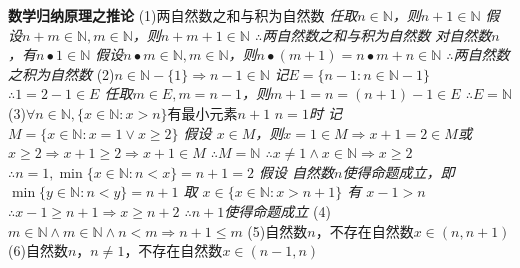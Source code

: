 \documentclass[11pt]{article}
\begin{document}
\textbf{数学归纳原理之推论} \newline
(1)两自然数之和与积为自然数 \newline
\textit{任取$n \in \mathbb{N}$，则$n+1 \in \mathbb{N}$ \newline
假设$n+m \in \mathbb{N}, m \in \mathbb{N}$，则$n+m+1 \in \mathbb{N}$ \newline
$\therefore$两自然数之和与积为自然数 \newline
对自然数$n$，有$n \bullet 1 \in \mathbb{N}$ \newline
假设$n \bullet m \in \mathbb{N}, m \in \mathbb{N}$，则$n\bullet(m+1)=n\bullet m+n \in \mathbb{N}$ \newline
$\therefore$两自然数之积为自然数} \newline
(2)$n \in \mathbb{N}-\{1\} \Rightarrow n-1 \in \mathbb{N}$ \newline
\textit{记$E=\{n-1:n\in \mathbb{N}-{1}\}$ \newline
$\therefore 1=2-1 \in E$ \newline
任取$m \in E, m=n-1$，则$m+1=n=(n+1)-1 \in E$ \newline
$\therefore E=\mathbb{N}$} \newline
(3)$\forall n \in \mathbb{N}, \{x\in\mathbb{N}:x>n\}$有最小元素$n+1$ \newline
\textit{$n=1$时 \newline
记 $M=\{x\in\mathbb{N}: x=1 \lor x\ge2\}$ \newline
假设 $x\in M$，则$x=1\in M\Rightarrow x+1=2\in M$或$x\ge2\Rightarrow x+1\ge2\Rightarrow x+1\in M$ \newline
$\therefore M=\mathbb{N}$ \newline
$\therefore x\not = 1\land x\in\mathbb{N}\Rightarrow x\ge2$ \newline
$\therefore n=1, \min\{x\in\mathbb{N}:n<x\}=n+1=2$ \newline
假设 自然数$n$使得命题成立，即$\min\{y\in\mathbb{N}:n<y\}=n+1$ \newline
取 $x\in\{x\in\mathbb{N}:x>n+1\}$ \newline
有 $x-1>n$ \newline
$\therefore x-1\ge n+1\Rightarrow x\ge n+2$ \newline
$\therefore$$n+1$使得命题成立} \newline
(4)$m\in\mathbb{N} \land m\in\mathbb{N} \land n<m \Rightarrow n+1\le m$ \newline
(5)自然数$n$，不存在自然数$x\in (n,n+1)$ \newline
(6)自然数$n$，$n\not = 1$，不存在自然数$x\in (n-1,n)$ \newline
\end{document}
